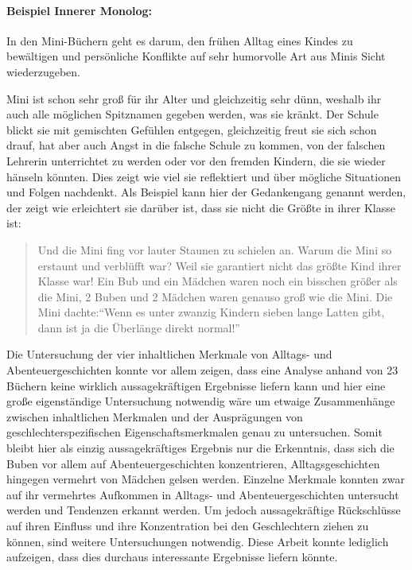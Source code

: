 \paragraph{Beispiel Innerer Monolog:}

In den Mini-Büchern geht es darum, den frühen Alltag eines Kindes zu
bewältigen und persönliche Konflikte auf sehr humorvolle Art aus Minis
Sicht wiederzugeben.

Mini ist schon sehr groß für ihr Alter und gleichzeitig sehr dünn,
weshalb ihr auch alle möglichen Spitznamen gegeben werden, was sie
kränkt. Der Schule blickt sie mit gemischten Gefühlen entgegen,
gleichzeitig freut sie sich schon drauf, hat aber auch Angst in die
falsche Schule zu kommen, von der falschen Lehrerin unterrichtet zu
werden oder vor den fremden Kindern, die sie wieder hänseln könnten.
Dies zeigt wie viel sie reflektiert und über mögliche Situationen und
Folgen nachdenkt. Als Beispiel kann hier der Gedankengang genannt
werden, der zeigt wie erleichtert sie darüber ist, dass sie nicht die
Größte in ihrer Klasse ist:

\begin{quote}
Und die Mini fing vor lauter Staunen zu schielen an. \textelp{} Warum
die Mini so erstaunt und verblüfft war? Weil sie garantiert nicht das
größte Kind ihrer Klasse war! Ein Bub und ein Mädchen waren noch ein
bisschen größer als die Mini, 2 Buben und 2 Mädchen waren genauso groß
wie die Mini. Die Mini dachte:``Wenn es unter zwanzig Kindern sieben
lange Latten gibt, dann ist ja die Überlänge direkt normal!''
\parencite[][61]{Noestlinger2011}
\end{quote}

Die Untersuchung der vier inhaltlichen Merkmale von Alltags- und
Abenteuergeschichten konnte vor allem zeigen, dass eine Analyse anhand
von 23 Büchern keine wirklich aussagekräftigen Ergebnisse liefern kann
und hier eine große eigenständige Untersuchung notwendig wäre um etwaige
Zusammenhänge zwischen inhaltlichen Merkmalen und der Ausprägungen von
geschlechterspezifischen Eigenschaftsmerkmalen genau zu untersuchen.
Somit bleibt hier als einzig aussagekräftiges Ergebnis nur die
Erkenntnis, dass sich die Buben vor allem auf Abenteuergeschichten
konzentrieren, Alltagsgeschichten hingegen vermehrt von Mädchen gelsen
werden. Einzelne Merkmale konnten zwar auf ihr vermehrtes Aufkommen in
Alltags- und Abenteuergeschichten untersucht werden und Tendenzen
erkannt werden. Um jedoch aussagekräftige Rückschlüsse auf ihren
Einfluss und ihre Konzentration bei den Geschlechtern ziehen zu können,
sind weitere Untersuchungen notwendig. Diese Arbeit konnte lediglich
aufzeigen, dass dies durchaus interessante Ergebnisse liefern könnte.

